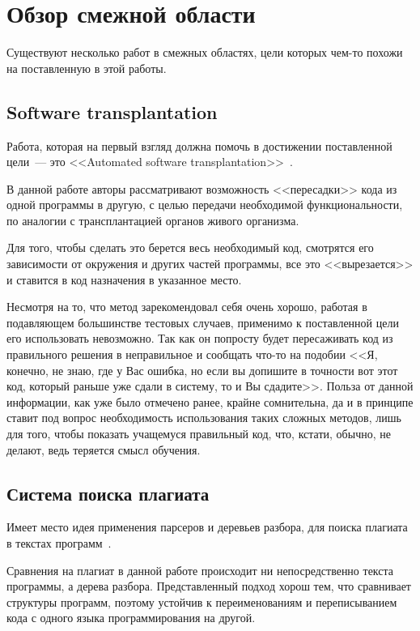 \startrelatedwork

\section{Обзор смежной области}
Существуют несколько работ в смежных областях, цели которых чем-то похожи на поставленную в этой работы.

\subsection{Software transplantation}
Работа, которая на первый взгляд должна помочь в достижении поставленной цели~--- 
это <<Automated software transplantation>>~\cite{software-transplantation}.

В данной работе авторы рассматривают возможность <<пересадки>> кода из одной программы в другую, с целью передачи 
необходимой функциональности, по аналогии с трансплантацией органов живого организма.

Для того, чтобы сделать это берется весь необходимый код, смотрятся его зависимости от окружения и других частей программы, 
все это <<вырезается>> и ставится в код назначения в указанное место.

Несмотря на то, что метод зарекомендовал себя очень хорошо, работая в подавляющем большинстве тестовых случаев, применимо к поставленной
цели его использовать невозможно. Так как он попросту будет пересаживать код из правильного решения в неправильное и сообщать
что-то на подобии <<Я, конечно, не знаю, где у Вас ошибка, но если вы допишите в точности вот этот код, 
который раньше уже сдали в систему, то и Вы сдадите>>. Польза от данной информации, как уже было отмечено ранее, крайне сомнительна,
да и в принципе ставит под вопрос необходимость использования таких сложных методов, лишь для того, чтобы показать учащемуся
правильный код, что, кстати, обычно, не делают, ведь теряется смысл обучения.

\subsection{Система поиска плагиата}
Имеет место идея применения парсеров и деревьев разбора, для поиска плагиата в текстах программ~\cite{anti-plagiat}.

Сравнения на плагиат в данной работе происходит ни непосредственно текста программы, а дерева разбора. Представленный
подход хорош тем, что сравнивает структуры программ, поэтому устойчив к переименованиям и переписыванием кода
с одного языка программирования на другой.

